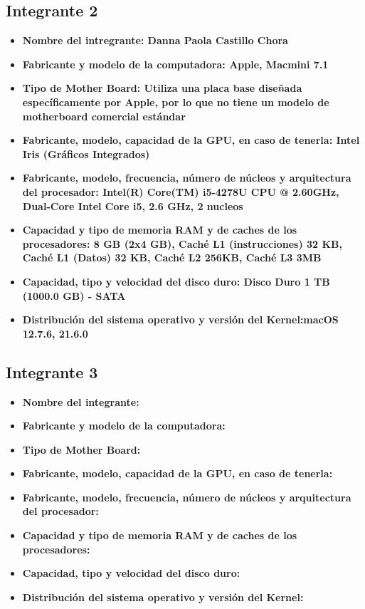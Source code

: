 \documentclass[12pt]{article}
\newcommand{\pl}[1]{\item \textbf{ #1 }}
\begin{document}
\subsection{Integrante 2}
\begin{itemize}
    \pl{Nombre del intregrante: Danna Paola Castillo Chora}

    \pl{Fabricante y modelo de la computadora: Apple, Macmini 7.1}

    \pl{Tipo de Mother Board: Utiliza una placa base diseñada específicamente por Apple, por lo que no tiene un modelo de motherboard comercial estándar}

    \pl{Fabricante, modelo, capacidad de la GPU, en caso de tenerla: Intel Iris (Gráficos Integrados)}

    \pl{Fabricante, modelo, frecuencia, número de núcleos y arquitectura del procesador: Intel(R) Core(TM) i5-4278U CPU @ 2.60GHz, Dual-Core Intel Core i5, 2.6 GHz, 2 nucleos}

    \pl{Capacidad y tipo de memoria RAM y de caches de los procesadores: 8 GB (2x4 GB), Caché L1 (instrucciones) 32 KB, Caché L1 (Datos) 32 KB, Caché L2 256KB, Caché L3 3MB}

    \pl{Capacidad, tipo y velocidad del disco duro: Disco Duro
1 TB (1000.0 GB) - SATA}

    \pl{Distribución del sistema operativo y versión del Kernel:macOS 12.7.6, 21.6.0}
\end{itemize}

\subsection{Integrante 3}
\begin{itemize}
    \pl{Nombre del integrante:}

    \pl{Fabricante y modelo de la computadora:}

    \pl{Tipo de Mother Board:}

    \pl{Fabricante, modelo, capacidad de la GPU, en caso de tenerla:}

    \pl{Fabricante, modelo, frecuencia, número de núcleos y arquitectura del procesador:}

    \pl{Capacidad y tipo de memoria RAM y de caches de los procesadores:}

    \pl{Capacidad, tipo y velocidad del disco duro:}

    \pl{Distribución del sistema operativo y versión del Kernel:}
\end{itemize}
\end{document}
